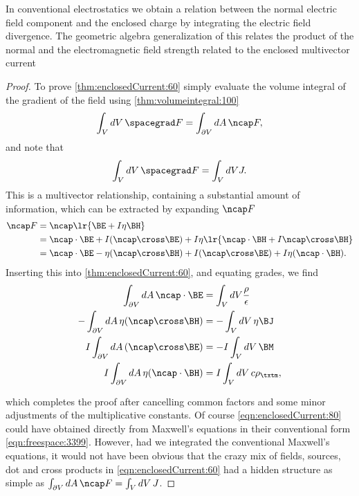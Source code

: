%
%
In conventional electrostatics we obtain a relation between the normal electric field component and the enclosed charge by integrating the electric field divergence.
The geometric algebra generalization of this relates the product of the normal and the electromagnetic field strength related to the enclosed multivector current

\begin{proof}
To prove \cref{thm:enclosedCurrent:60}
simply evaluate the volume integral of the gradient of the field using \cref{thm:volumeintegral:100}
\begin{equation}\label{eqn:enclosedCurrent:20}
\int_V dV\, \spacegrad F = \int_{\partial V} dA\, \ncap F,
\end{equation}
and note that
\begin{equation}\label{eqn:enclosedCurrent:60}
\int_V dV\, \spacegrad F = \int_V dV J.
\end{equation}
This is a multivector relationship, containing a substantial amount of information, which can be
extracted by
expanding \( \ncap F \)
\begin{equation}\label{eqn:enclosedCurrent:40}
\begin{aligned}
\ncap F
&= \ncap \lr{ \BE + I \eta \BH } \\
&= \ncap \cdot \BE + I (\ncap \cross \BE) + I \eta \lr{ \ncap \cdot \BH + I \ncap \cross \BH } \\
&= \ncap \cdot \BE - \eta ( \ncap \cross \BH ) + I (\ncap \cross \BE) + I \eta (\ncap \cdot \BH).
\end{aligned}
\end{equation}
Inserting this into
\cref{thm:enclosedCurrent:60}, and equating grades, we find
\begin{equation}\label{eqn:enclosedCurrent:80}
\begin{aligned}
\int_{\partial V} dA \,\ncap \cdot \BE &= \int_V dV \frac{\rho}{\epsilon} \\
- \int_{\partial V} dA\, \eta ( \ncap \cross \BH ) &= - \int_V dV\, \eta \BJ \\
 I \int_{\partial V} dA\, (\ncap \cross \BE) &= - I \int_V dV\, \BM \\
 I \int_{\partial V} dA\, \eta (\ncap \cdot \BH) &=  I \int_V dV\, c \rho_\txtm,
\end{aligned}
\end{equation}

which completes the proof after cancelling common factors and some minor adjustments of the multiplicative constants.
Of course \cref{eqn:enclosedCurrent:80}
could have obtained directly from Maxwell's equations in their conventional form \cref{eqn:freespace:3399}.
However, had we integrated the conventional Maxwell's equations, it would not have been obvious that the crazy mix of
fields, sources, dot and cross products in \cref{eqn:enclosedCurrent:60} had a hidden structure as simple as
\( \int_{\partial V} dA\, \ncap F = \int_V dV\, J \).
\end{proof}
